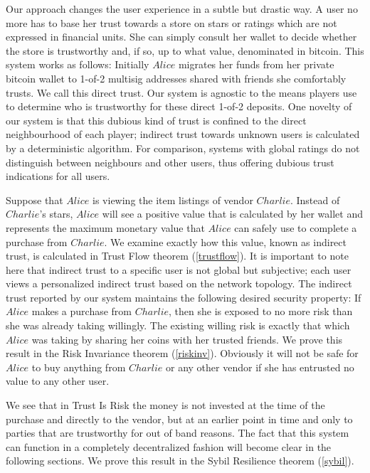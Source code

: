   Our approach changes the user experience in a subtle but drastic way. A user no more has to base her trust towards a
  store on stars or ratings which are not expressed in financial units. She can simply consult her wallet to decide whether
  the store is trustworthy and, if so, up to what value, denominated in bitcoin. This system works as follows: Initially
  $Alice$ migrates her funds from her private bitcoin wallet to 1-of-2 multisig addresses shared with friends she
  comfortably trusts. We call this direct trust. Our system is agnostic to the means players use to determine who is
  trustworthy for these direct 1-of-2 deposits. One novelty of our system is that this dubious kind of trust is confined to
  the direct neighbourhood of each player; indirect trust towards unknown users is calculated by a deterministic algorithm.
  For comparison, systems with global ratings do not distinguish between neighbours and other users, thus offering dubious
  trust indications for all users.

  Suppose that $Alice$ is viewing the item listings of vendor $Charlie$. Instead of $Charlie$'s stars, $Alice$ will see a
  positive value that is calculated by her wallet and represents the maximum monetary value that $Alice$ can safely use to
  complete a purchase from $Charlie$. We examine exactly how this value, known as indirect trust, is calculated in Trust
  Flow theorem (\ref{trustflow}). It is important to note here that indirect trust to a specific user is not global but
  subjective; each user views a personalized indirect trust based on the network topology. The indirect trust reported by
  our system maintains the following desired security property: If $Alice$ makes a purchase from $Charlie$, then she is
  exposed to no more risk than she was already taking willingly. The existing willing risk is exactly that which $Alice$
  was taking by sharing her coins with her trusted friends. We prove this result in the Risk Invariance theorem
  (\ref{riskinv}). Obviously it will not be safe for $Alice$ to buy anything from $Charlie$ or any other vendor if she has
  entrusted no value to any other user.

  We see that in Trust Is Risk the money is not invested at the time of the purchase and directly to the vendor, but at an
  earlier point in time and only to parties that are trustworthy for out of band reasons. The fact that this system can
  function in a completely decentralized fashion will become clear in the following sections. We prove this result in the
  Sybil Resilience theorem (\ref{sybil}).

